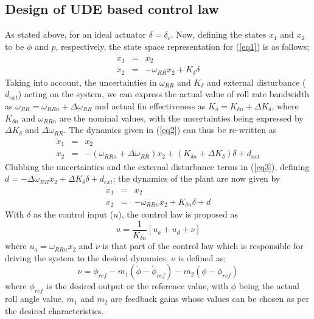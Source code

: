 \documentclass[conference]{IEEEtran}
\begin{document}
\subsection{Design of UDE based control law}
As stated above, for an ideal actuator $\delta = \delta_c$. Now, defining the states $x_1$ and $x_2$ to be $\phi$ and $p$, respectively, the state space representation for (\ref{eq1}) is as follows;
%
\begin{eqnarray}
\dot{x}_1 &=& x_2 \nonumber \\
\dot{x}_2 &=& - \omega_{RR}x_2 + K_{\delta}\delta
\label{eq2}
\end{eqnarray}
%
Taking into account, the uncertainties in $\omega_{RR}$ and $K_{\delta}$ and external disturbance ($d_{ext}$) acting on the system, we can express the actual value of roll rate bandwidth as $\omega_{RR}= \omega_{RR n}+\Delta\omega_{RR}$ and actual fin effectiveness as $K_\delta = K_{\delta n}+\Delta K_{\delta}$, where $K_{\delta n}$ and $\omega_{RR n}$ are the nominal values, with the uncertainties being expressed by $\Delta K_{\delta}$ and $\Delta\omega_{RR}$. The dynamics given in (\ref{eq2}) can thus be re-written as
%
\begin{eqnarray}
\dot{x}_1 &=& x_2 \nonumber \\
\dot{x}_2 &=& -( \omega_{RRn} + \Delta\omega_{RR})x_2 + (K_{\delta n} + \Delta K_{\delta} )\delta + d_{ext}
\label{eq3}
\end{eqnarray}
%
Clubbing the uncertainties and the external disturbance terms in (\ref{eq3}), defining $d = -\Delta\omega_{RR}x_2 + \Delta K_{\delta} \delta + d_{ext}$; the dynamics of the plant are now given by
%
\begin{eqnarray}
\dot{x}_1 &=& x_2 \nonumber \\
\dot{x}_2 &=& - \omega_{RRn}x_2 + K_{\delta n}\delta + d
\label{eq4}
\end{eqnarray}
%
With $\delta$ as the control input ($u$), the control law is proposed as
%
\begin{equation}
u = \frac{1}{K_{\delta n}}\left[u_a + u_d + \nu \right]
\label{eq5}
\end{equation}
%
where $u_a =  \omega_{RRn}x_2$ and $\nu$ is that part of the control law which is responsible for driving the system to the desired dynamics. $\nu$ is defined as;
%
\begin{equation}
\nu = \ddot{\phi}_{ref} - m_1(\dot{\phi} - \dot{\phi}_{ref}) - m_2(\phi - \phi_{ref})
\label{eq6}
\end{equation}
%
where $\phi_{ref}$ is the desired output or the reference value, with $\phi$ being the actual roll angle value. $m_1$ and $m_2$ are feedback gains whose values can be chosen as per the desired characteristics.
\end{document}
